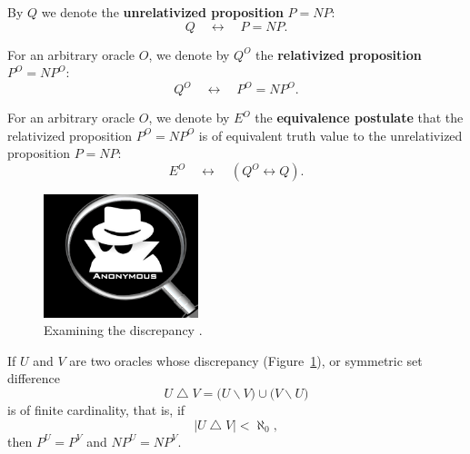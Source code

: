\documentclass[letterpaper]{article}
\begin{document}
\begin{construction}\label{oq}
	By $Q$ we denote the \textbf{unrelativized proposition} \mbox{$P=NP$}:
\begin{equation}
Q\quad\longleftrightarrow\quad P=NP.
\end{equation}
\end{construction}
\begin{construction}\label{oqo}
For an arbitrary oracle $O$, we denote by $Q^O$ the \textbf{relativized proposition} \mbox{$P^O=NP^O$}:
\begin{equation}
Q^O\quad\longleftrightarrow\quad P^O=NP^O.
\end{equation}
\end{construction}
\begin{construction}\label{oeo}
	For an arbitrary oracle $O$, we denote by $E^O$ the \textbf{equivalence postulate} that the relativized proposition $P^O=NP^O$ is of equivalent truth value to the unrelativized proposition $P=NP$:
	\begin{equation}
	 E^O\quad\longleftrightarrow\quad (Q^O\longleftrightarrow Q).
	\end{equation}
\end{construction}
\begin{lemma}
\label{lemmadelta}
\begin{figure}
	\centering
	\includegraphics[width=0.40\textwidth]{images/Anonymous.png}
	\caption[Examining the discrepancy]{Examining the discrepancy \cite{akshayhallur2014}.}\label{figdiscrepancy}
\end{figure}
If $U$ and $V$ are two oracles whose discrepancy (Figure~\ref{figdiscrepancy}), or symmetric set difference
\begin{equation}
U\operatorname{\triangle} V=\big(U\operatorname\backslash V\big)\cup\big(V\operatorname\backslash U\big)
\end{equation}
is of finite cardinality, that is, if
\begin{equation}
\left|U\operatorname{\triangle} V\right|<\aleph_0,
\end{equation}
then $P^U=P^V$ and $NP^U=NP^V$.
\end{lemma}
\end{document}
